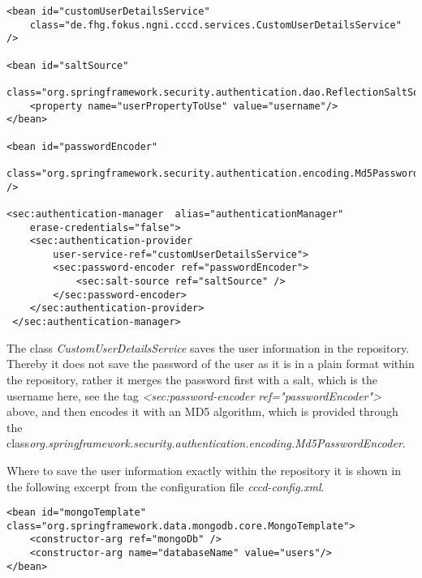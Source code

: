 \begin{code}
\begin{verbatim}
<bean id="customUserDetailsService" 
	class="de.fhg.fokus.ngni.cccd.services.CustomUserDetailsService" />

<bean id="saltSource" 
	class="org.springframework.security.authentication.dao.ReflectionSaltSource">
	<property name="userPropertyToUse" value="username"/>
</bean>

<bean id="passwordEncoder" 
	class="org.springframework.security.authentication.encoding.Md5PasswordEncoder" />

<sec:authentication-manager  alias="authenticationManager" 
	erase-credentials="false">
	<sec:authentication-provider 
		user-service-ref="customUserDetailsService">
 		<sec:password-encoder ref="passwordEncoder">
 			<sec:salt-source ref="saltSource" />
 		</sec:password-encoder>
 	</sec:authentication-provider>
 </sec:authentication-manager>
\end{verbatim}
\end{code}

The class \textit{CustomUserDetailsService} saves the user information in the repository. Thereby it does not save the password of the user as it is in a plain format within the repository, rather it merges the password first with a salt, which is the username here, see the tag \textit{<sec:password-encoder ref="passwordEncoder">} above, and then encodes it with an MD5 algorithm, which is provided through the class\textit{org.springframework.security.authentication.encoding.Md5PasswordEncoder}.

Where to save the user information exactly within the repository it is shown in the following excerpt from the configuration file \textit{cccd-config.xml}.
\begin{code}
\begin{verbatim}
<bean id="mongoTemplate" class="org.springframework.data.mongodb.core.MongoTemplate">
	<constructor-arg ref="mongoDb" />
	<constructor-arg name="databaseName" value="users"/>
</bean>
\end{verbatim}
\end{code}

